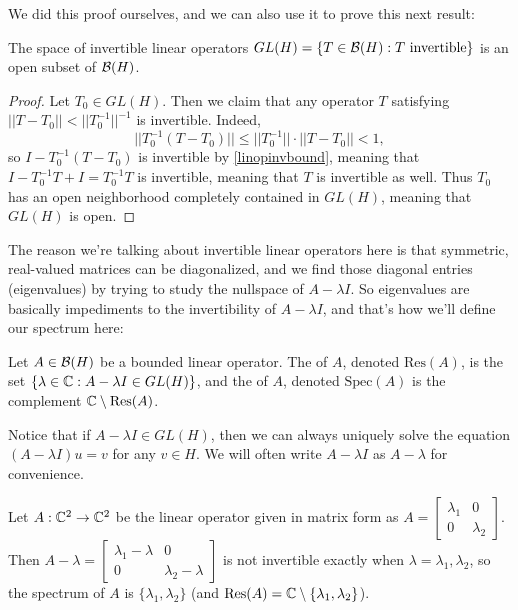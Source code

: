 We did this proof ourselves, and we can also use it to prove this next result:

\begin{proposition}
The space of invertible linear operators $GL(H) = \{T \in \mathcal{B}(H): T \text{ invertible}\}$ is an open subset of $\mathcal{B}(H)$.
\end{proposition}
\begin{proof}
Let $T_0 \in GL(H)$. Then we claim that any operator $T$ satisfying $||T - T_0|| < ||T_0^{-1}||^{-1}$ is invertible. Indeed,
\[
    ||T_0^{-1}(T - T_0)|| \le ||T_0^{-1}|| \cdot ||T - T_0|| < 1,
\]
so $I - T_0^{-1}(T-T_0)$ is invertible by \cref{linopinvbound}, meaning that $I - T_0^{-1}T + I = T_0^{-1}T$ is invertible, meaning that $T$ is invertible as well. Thus $T_0$ has an open neighborhood completely contained in $GL(H)$, meaning that $GL(H)$ is open.
\end{proof}

The reason we're talking about invertible linear operators here is that symmetric, real-valued matrices can be diagonalized, and we find those diagonal entries (eigenvalues) by trying to study the nullspace of $A - \lambda I$. So eigenvalues are basically impediments to the invertibility of $A - \lambda I$, and that's how we'll define our spectrum here:

\begin{definition}
Let $A \in \mathcal{B}(H)$ be a bounded linear operator. The  of $A$, denoted $\text{Res}(A)$, is the set $\{\lambda \in \mathbb C: A - \lambda I \in GL(H)\}$, and the  of $A$, denoted $\text{Spec}(A)$ is the complement $\mathbb C \setminus \text{Res}(A)$.
\end{definition}

Notice that if $A - \lambda I \in GL(H)$, then we can always uniquely solve the equation $(A - \lambda I) u = v$ for any $v \in H$. We will often write $A - \lambda I$ as $A - \lambda$ for convenience. 

\begin{example}
Let $A: \mathbb C^2 \to \mathbb C^2$ be the linear operator given in matrix form as $A = \begin{bmatrix} \lambda_1 & 0 \\ 0 & \lambda_2 \end{bmatrix}$. Then $A - \lambda = \begin{bmatrix} \lambda_1 - \lambda & 0 \\ 0 & \lambda_2 - \lambda \end{bmatrix}$ is not invertible exactly when $\lambda = \lambda_1, \lambda_2$, so the spectrum of $A$ is $\{\lambda_1, \lambda_2\}$ (and $\text{Res}(A) = \mathbb C \setminus \{\lambda_1, \lambda_2\}$).
\end{example}

